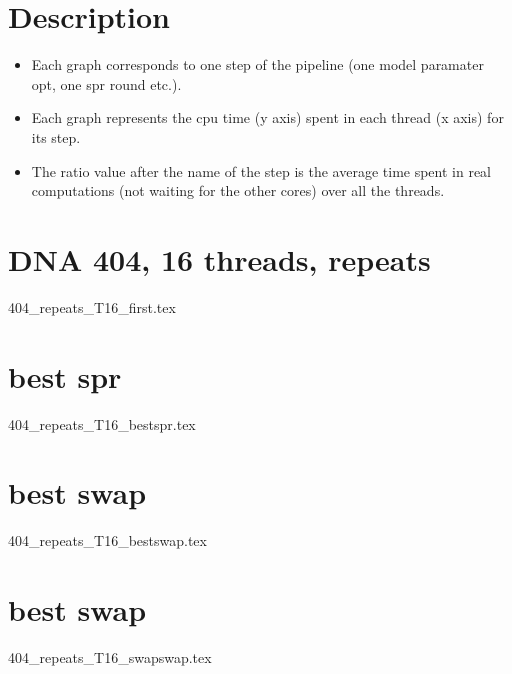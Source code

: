 \documentclass[12pt,a4paper]{article}
\begin{document}
\newcommand*{\figuretitle}[1]{%
    {\centering%
    \textbf{#1}%
    \par\medskip}%
}

\section{Description}
\begin{itemize}
\item Each graph  corresponds to one step of the pipeline (one model paramater opt, one spr round etc.).
\item Each graph represents the cpu time (y axis) spent in each thread (x axis) for its step.
\item The ratio value after the name of the step is the average time spent in real computations (not waiting for the other cores) over all the threads. 
\end{itemize}



\section{DNA 404, 16 threads,  repeats} 
{404_repeats_T16_first.tex}
\section{best spr} 
{404_repeats_T16_bestspr.tex}
\section{best swap} 
{404_repeats_T16_bestswap.tex}
\section{best swap} 
{404_repeats_T16_swapswap.tex}
\end{document}
